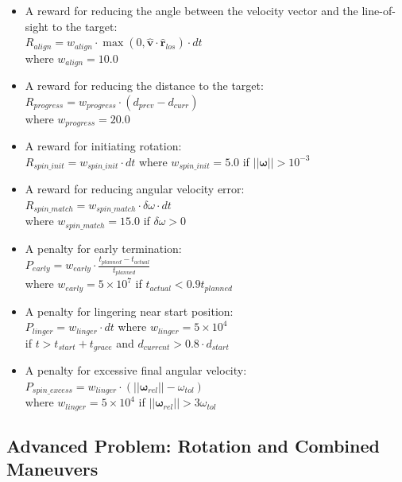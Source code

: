 \begin{itemize}
    \item A reward for reducing the angle between the velocity vector and the line-of-sight
          to the target:\\ $R_{align} = w_{align} \cdot \max(0, \hat{\mathbf{v}} \cdot \hat{\mathbf{r}}_{los}) \cdot dt$ \\where $w_{align} = 10.0$
    \item A reward for reducing the distance to the target: \\$R_{progress} = w_{progress} \cdot (d_{prev} - d_{curr})$ \\where $w_{progress} = 20.0$
    \item A reward for initiating rotation: \\$R_{spin\_init} = w_{spin\_init} \cdot dt$ where $w_{spin\_init} = 5.0$ if $||\boldsymbol{\omega}|| > 10^{-3}$
    \item A reward for reducing angular velocity error: \\$R_{spin\_match} = w_{spin\_match} \cdot \delta\omega \cdot dt$ \\where $w_{spin\_match} = 15.0$ if $\delta\omega > 0$
    \item A penalty for early termination: \\$P_{early} = w_{early} \cdot \frac{t_{planned} - t_{actual}}{t_{planned}}$ \\where $w_{early} = 5 \times 10^7$ if $t_{actual} < 0.9 t_{planned}$
    \item A penalty for lingering near start position: \\$P_{linger} = w_{linger} \cdot dt$ where $w_{linger} = 5 \times 10^4$ \\if $t > t_{start} + t_{grace}$ and $d_{current} > 0.8 \cdot d_{start}$
    \item A penalty for excessive final angular velocity: \\$P_{spin\_excess} = w_{linger} \cdot (||\boldsymbol{\omega}_{rel}|| - \omega_{tol})$ \\where $w_{linger} = 5 \times 10^4$ if $||\boldsymbol{\omega}_{rel}|| > 3\omega_{tol}$
\end{itemize}



\subsection{Advanced Problem: Rotation and Combined Maneuvers}

